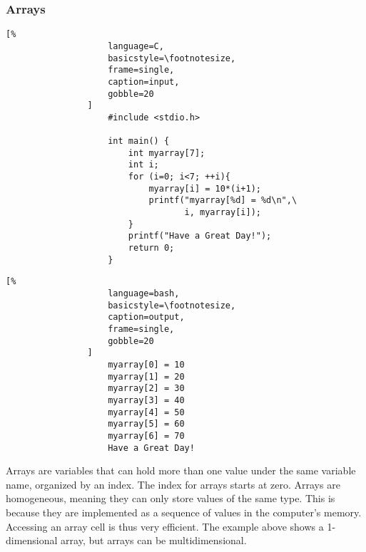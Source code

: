 \documentclass[crop=false,class=article,oneside]{standalone}
\begin{document}
        \subsubsection{Arrays}
            \begin{minipage}[t]{.48\textwidth}
                \centering
                \begin{lstlisting}[%
                    language=C,
                    basicstyle=\footnotesize,
                    frame=single,
                    caption=input,
                    gobble=20
                ]
                    #include <stdio.h>
                    
                    int main() {
                        int myarray[7];
                        int i;
                        for (i=0; i<7; ++i){
                            myarray[i] = 10*(i+1);
                            printf("myarray[%d] = %d\n",\
                                   i, myarray[i]);
                        }
                        printf("Have a Great Day!");
                        return 0;
                    }
                \end{lstlisting}
            \end{minipage}\hfill
            \begin{minipage}[t]{.48\textwidth}
                \centering
                \begin{lstlisting}[%
                    language=bash,
                    basicstyle=\footnotesize,
                    caption=output,
                    frame=single,
                    gobble=20
                ]
                    myarray[0] = 10
                    myarray[1] = 20
                    myarray[2] = 30
                    myarray[3] = 40
                    myarray[4] = 50
                    myarray[5] = 60
                    myarray[6] = 70
                    Have a Great Day!
            \end{lstlisting}
        \end{minipage}
            \newpage
            Arrays are variables that can hold more than one value
            under the same variable name, organized by an index. The
            index for arrays starts at zero. Arrays are
            homogeneous, meaning they can only store values of the
            same type. This is because they are implemented as a
            sequence of values in the computer's memory. Accessing
            an array cell is thus very efficient. The example above
            shows a 1-dimensional array, but arrays can be
            multidimensional.
\end{document}
